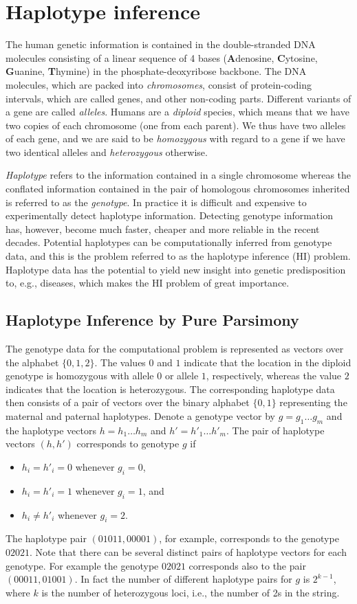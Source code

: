 \documentclass[12pt,a4paper]{article}
\begin{document}
\section{Haplotype inference}
\label{sec:hipp}
The human genetic information is contained in the double-stranded DNA molecules consisting of a linear sequence of 4 bases (\textbf{A}denosine, \textbf{C}ytosine, \textbf{G}uanine, \textbf{T}hymine) in the phosphate-deoxyribose backbone.
The DNA molecules, which are packed into \emph{chromosomes}, consist of protein-coding intervals, which are called genes, and other non-coding parts.
Different variants of a gene are called \emph{alleles}.
Humans are a \emph{diploid} species, which means that we have two copies of each chromosome (one from each parent).
We thus have two alleles of each gene, and we are said to be \emph{homozygous} with regard to a gene if we have two identical alleles and \emph{heterozygous} otherwise.

\emph{Haplotype} refers to the information contained in a single chromosome whereas the conflated information contained in the pair of  homologous chromosomes inherited is referred to as the \emph{genotype}.
In practice it is difficult and expensive to experimentally detect haplotype information.
Detecting genotype information has, however, become much faster, cheaper and more reliable in the recent decades.
Potential haplotypes can be computationally inferred from genotype data, and this is the problem referred to as the haplotype inference (HI) problem.
Haplotype data has the potential to yield new insight into genetic predisposition to, e.g., diseases, which makes the HI problem of great importance.

\subsection{Haplotype Inference by Pure Parsimony}
The genotype data for the computational problem is represented as vectors over the alphabet $\{0, 1, 2\}$. 
The values $0$ and $1$ indicate that the location in the diploid genotype is homozygous with allele $0$ or allele $1$, respectively, 
whereas the value $2$ indicates that the location is heterozygous.
The corresponding haplotype data then consists of a pair of vectors over the binary alphabet $\{0, 1\}$ representing the maternal and paternal haplotypes.
Denote a genotype vector by $g=g_1\dots g_m$ and the haplotype vectors $h=h_1\dots h_m$ and $h'=h'_1\dots h'_m$.
The pair of haplotype vectors $(h, h')$ corresponds to genotype $g$ if 
\begin{itemize}
\item $h_i=h'_i=0$ whenever $g_i = 0$,
\item $h_i=h'_i=1$ whenever $g_i = 1$, and
\item $h_i \neq h'_i$ whenever $g_i = 2$.
\end{itemize}
The haplotype pair $(01011, 00001)$, for example, corresponds to the genotype $02021$.
Note that there can be several distinct pairs of haplotype vectors for each genotype.
For example the genotype $02021$ corresponds also to the pair $(00011, 01001)$.
In fact the number of different haplotype pairs for $g$ is $2^{k-1}$, where $k$ is the number of heterozygous loci, i.e., the number of 2s in the string.
\end{document}
